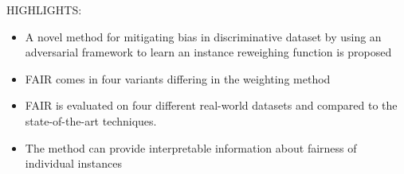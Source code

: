 \documentclass[preprint,12pt,authoryear]{elsarticle}
\begin{document}
	
	\thispagestyle{empty}
	
	HIGHLIGHTS:
	
	\begin{itemize}
		\item  A novel method for mitigating bias in discriminative dataset by using an adversarial framework to learn an instance reweighing function is proposed
		\item  FAIR comes in four variants differing in the weighting method
		\item FAIR is evaluated on four different real-world datasets and compared to the state-of-the-art techniques.
		\item The method can provide interpretable information about fairness of individual instances
	\end{itemize}
	
\end{document}
